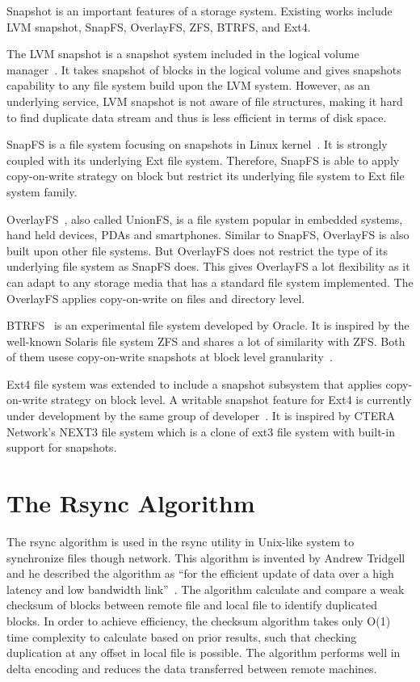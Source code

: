     Snapshot is an important features of a storage system. Existing works include LVM snapshot, SnapFS, OverlayFS, ZFS, BTRFS, and Ext4.
    
    The LVM snapshot is a snapshot system included in the logical volume manager~\cite{lvm, disk_perform_lvm}. It takes snapshot of blocks in the logical volume and gives snapshots capability to any file system build upon the LVM system. However, as an underlying service, LVM snapshot is not aware of file structures, making it hard to find duplicate data stream and thus is less efficient in terms of disk space.
    
    SnapFS is a file system focusing on snapshots in Linux kernel~\cite{snapfs}. It is strongly coupled with its underlying Ext file system. Therefore, SnapFS is able to apply copy-on-write strategy on block but restrict its underlying file system to Ext file system family. 
    
    OverlayFS~\cite{overlayfs}, also called UnionFS, is a file system popular in embedded systems, hand held devices, PDAs and smartphones. Similar to SnapFS, OverlayFS is also built upon other file systems. But OverlayFS does not restrict the type of its underlying file system as SnapFS does. This gives OverlayFS a lot flexibility as it can adapt to any storage media that has a standard file system implemented. The OverlayFS applies copy-on-write on files and directory level.

    BTRFS~\cite{btrfs} is an experimental file system developed by Oracle. It is inspired by the well-known Solaris file system ZFS and shares a lot of similarity with ZFS. Both of them usese copy-on-write snapshots at block level granularity~\cite{btrfscow}.
    
    Ext4 file system was extended to include a snapshot subsystem that applies copy-on-write strategy on block level. A writable snapshot feature for Ext4 is currently under development by the same group of developer~\cite{ext4snap}. It is inspired by CTERA Network's NEXT3 file system which is a clone of ext3 file system with built-in support for snapshots.

\section{The Rsync Algorithm}
    
    The rsync algorithm is used in the rsync utility in Unix-like system to synchronize files though network. This algorithm is invented by Andrew Tridgell and he described the algorithm as ``for the efficient update of data over a high latency and low bandwidth link''~\cite{rsync_alg}. The algorithm calculate and compare a weak checksum of blocks between remote file and local file to identify duplicated blocks. In order to achieve efficiency, the checksum algorithm takes only O(1) time complexity to calculate based on prior results, such that checking duplication at any offset in local file is possible. The algorithm performs well in delta encoding and reduces the data transferred between remote machines.

